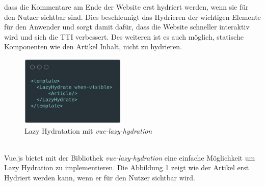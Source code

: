 \documentclass[runningheads]{llncs}
\begin{document}
dass die Kommentare am Ende der Website erst hydriert werden, 
wenn sie für den Nutzer sichtbar sind. 
Dies beschleunigt das Hydrieren der wichtigen Elemente für den Anwender und sorgt damit dafür, 
dass die Website schneller interaktiv wird und sich die TTI verbessert. 
Des weiteren ist es auch möglich, 
statische Komponenten wie den Artikel Inhalt, nicht zu hydrieren.
\begin{figure}[h]
  \centering
  \includegraphics[width=5cm]{images/LazyHydration}
  \caption{Lazy Hydratation mit \textit{vue-lazy-hydration}}
  \label{Lazy Hydratation mit vue-lazy-hydration}
\end{figure}
\\
Vue.js bietet mit der Bibliothek \textit{vue-lazy-hydration }
eine einfache Möglichkeit um Lazy Hydration zu implementieren. 
Die Abbildung \ref{Lazy Hydratation mit vue-lazy-hydration} zeigt wie der Artikel erst Hydriert werden kann, 
wenn er für den Nutzer sichtbar wird. \cite{maoberlehner_2018}
\end{document}
